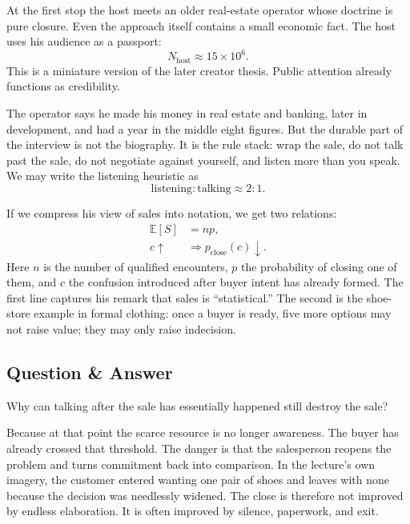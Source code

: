 At the first stop the host meets an older real-estate operator whose doctrine is pure closure. Even the approach itself contains a small economic fact. The host uses his audience as a passport:
\begin{equation}
N_{\text{host}} \approx 15 \times 10^6.
\end{equation}
This is a miniature version of the later creator thesis. Public attention already functions as credibility.

The operator says he made his money in real estate and banking, later in development, and had a year in the middle eight figures. But the durable part of the interview is not the biography. It is the rule stack: wrap the sale, do not talk past the sale, do not negotiate against yourself, and listen more than you speak. We may write the listening heuristic as
\begin{equation}
\text{listening} : \text{talking} \approx 2:1.
\end{equation}

If we compress his view of sales into notation, we get two relations:
\begin{align}
\mathbb{E}[S] &= np,\\
c \uparrow &\Rightarrow p_{\text{close}}(c)\downarrow.
\end{align}
Here \(n\) is the number of qualified encounters, \(p\) the probability of closing one of them, and \(c\) the confusion introduced after buyer intent has already formed. The first line captures his remark that sales is ``statistical.'' The second is the shoe-store example in formal clothing: once a buyer is ready, five more options may not raise value; they may only raise indecision.

\subsection{Question \& Answer}

Why can talking after the sale has essentially happened still destroy the sale?

Because at that point the scarce resource is no longer awareness. The buyer has already crossed that threshold. The danger is that the salesperson reopens the problem and turns commitment back into comparison. In the lecture's own imagery, the customer entered wanting one pair of shoes and leaves with none because the decision was needlessly widened. The close is therefore not improved by endless elaboration. It is often improved by silence, paperwork, and exit.

